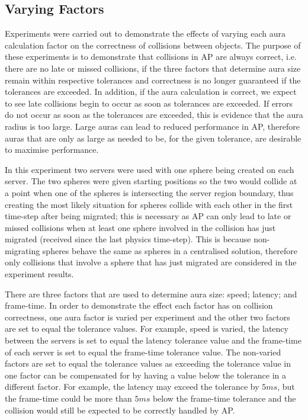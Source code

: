 \subsection{Varying Factors}
Experiments were carried out to demonstrate the effects of varying each aura calculation factor on the correctness of collisions between objects. The purpose of these experiments is to demonstrate that collisions in AP are always correct, i.e. there are no late or missed collisions, if the three factors that determine aura size remain within respective tolerances and correctness is no longer guaranteed if the tolerances are exceeded. In addition, if the aura calculation is correct, we expect to see late collisions begin to occur as soon as tolerances are exceeded. If errors do not occur as soon as the tolerances are exceeded, this is evidence that the aura radius is too large. Large auras can lead to reduced performance in AP, therefore auras that are only as large as needed to be, for the given tolerance, are desirable to maximise performance.

In this experiment two servers were used with one sphere being created on each server. The two spheres were given starting positions so the two would collide at a point when one of the spheres is intersecting the server region boundary, thus creating the most likely situation for spheres collide with each other in the first time-step after being migrated; this is necessary as AP can only lead to late or missed collisions when at least one sphere involved in the collision has just migrated (received since the last physics time-step). This is because non-migrating spheres behave the same as spheres in a centralised solution, therefore only collisions that involve a sphere that has just migrated are considered in the experiment results.

There are three factors that are used to determine aura size: speed; latency; and frame-time. In order to demonstrate the effect each factor has on collision correctness, one aura factor is varied per experiment and the other two factors are set to equal the tolerance values. For example, speed is varied, the latency between the servers is set to equal the latency tolerance value and the frame-time of each server is set to equal the frame-time tolerance value. The non-varied factors are set to equal the tolerance values as exceeding the tolerance value in one factor can be compensated for by having a value below the tolerance in a different factor. For example, the latency may exceed the tolerance by $5ms$, but the frame-time could be more than $5ms$ below the frame-time tolerance and the collision would still be expected to be correctly handled by AP.

